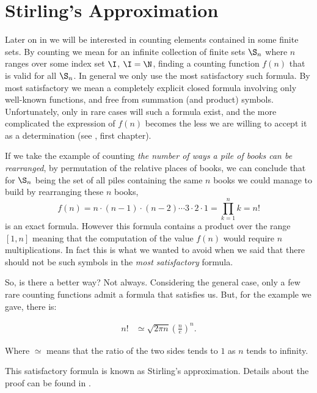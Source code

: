 \section{Stirling's Approximation}
\label{tree:sorting:stirling}

Later on in  we will be interested in counting elements
contained in some
finite sets. By counting we mean for an infinite collection of finite sets
$\S_n$ where $n$ ranges over some index set $\I$, \eg $\I = \N$, finding a
counting function $f(n)$ that is valid for all $\S_n$. In general we only
use the most satisfactory such formula. By most satisfactory we mean a
completely explicit closed formula involving only well-known functions, and
free from summation (and product) symbols. Unfortunately, only in rare cases
will such a formula exist, and the more complicated the expression of $f(n)$
becomes the less we are willing to accept it as a determination
(see \citet*{Stanley:2011:ECV:2124415}, first chapter).

If we take the example of counting \emph{the number of ways a pile of books can
be rearranged}, \ie by permutation of the relative places of books, we can
conclude that for $\S_n$ being the set of all piles containing the same $n$
books we could manage to build by rearranging these $n$ books,
\begin{displaymath}
f(n) = n \cdot (n-1) \cdot (n-2) \cdots 3 \cdot 2 \cdot 1 = \prod_{k=1}^n k = n!
\end{displaymath}
is an exact formula. However this formula contains a product over the range
$[1, n]$ meaning that the computation of the value $f(n)$ would require $n$
multiplications. In fact this is what we wanted to avoid when we said that
there should not be such symbols in the \emph{most satisfactory} formula.

So, is there a better way? Not always. Considering the general case, only a few
rare counting functions admit a formula that satisfies us. But, for
the example we gave, there is:
\begin{theorem}
\label{tree:sorting:theorem/stirling}
\begin{align*}
n! &\simeq \sqrt{2 \pi n} \left(\frac{n}{e}\right)^n.
\end{align*}
\end{theorem}
Where \(\simeq\) means that the ratio of the two sides tends to \(1\) as \(n\)
tends to infinity.

This satisfactory formula is known as Stirling's approximation. Details
about the proof can be found in \citet*{feller1967direct}.

